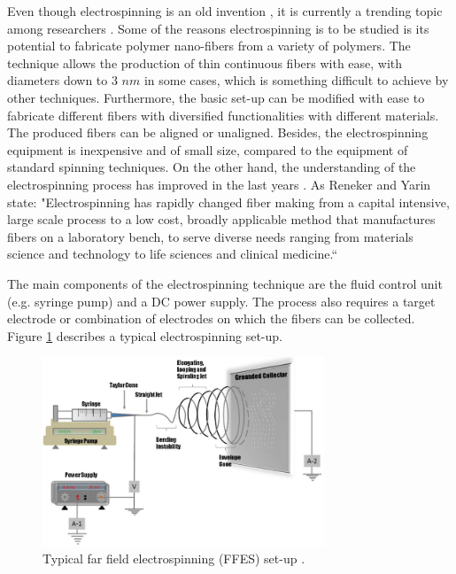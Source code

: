 Even though electrospinning is an old invention \cite{Anton1930}, it is currently a trending topic among researchers \cite{Huang2003,Reneker2008,Schiffman2008}. Some of the reasons electrospinning is to be studied is its potential to fabricate polymer nano-fibers from a variety of polymers. The technique allows the production of thin continuous fibers with ease, with diameters down to 3 $n m$ in some cases, which is something difficult to achieve by other techniques. Furthermore, the basic set-up can be modified with ease to fabricate different fibers with diversified functionalities with different materials. The produced fibers can be aligned or unaligned. Besides, the electrospinning equipment is inexpensive and of small size, compared to the equipment of standard spinning techniques. On the other hand, the understanding of the electrospinning process has improved in the last years \cite{Li2012}. As Reneker and Yarin state: "Electrospinning has rapidly changed fiber making from a capital intensive, large scale process to a low cost, broadly applicable method that manufactures fibers on a laboratory bench, to serve diverse needs ranging from materials science and technology to life sciences and clinical medicine.`` \cite{Reneker2008}

The main components of the electrospinning technique are the fluid control unit (e.g. syringe pump) and a DC power supply. The process also requires a target electrode or combination of electrodes on which the fibers can be collected. Figure \ref{fig:FFES} describes a typical electrospinning set-up. \cite{Li2012}

\begin{figure}[th]
\centering
\includegraphics[width=0.75\textwidth]{./Figures/FFES.png}
\decoRule
\caption[Far Field Electrospinning set-up]{Typical far field electrospinning (FFES) set-up \cite{Li2012}.}
\label{fig:FFES}
\end{figure}

